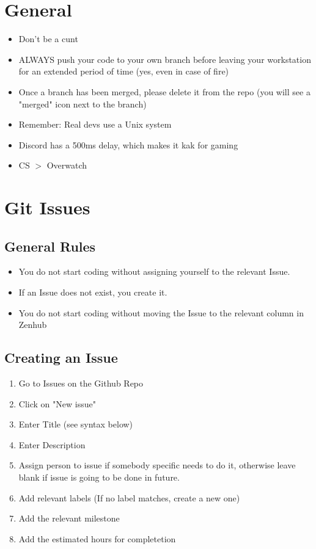 \documentclass{article}
\begin{document}
\newpage
\tableofcontents
\newpage
	
	\section{General}
		\begin{itemize}
			\item Don't be a cunt
			\item ALWAYS push your code to your own branch before leaving your workstation for an extended period of time (yes, even in case of fire)
			\item Once a branch has been merged, please delete it from the repo (you will see a "merged" icon next to the branch)
			\item Remember: Real devs use a Unix system
			\item Discord has a 500ms delay, which makes it kak for gaming
			\item CS $>$ Overwatch
		\end{itemize}
		
	\section{Git Issues}
		\subsection{General Rules}
			\begin{itemize}
				\item You do not start coding without assigning yourself to the relevant Issue.
				\item If an Issue does not exist, you create it.
				\item You do not start coding without moving the Issue to the relevant column in Zenhub
			\end{itemize}
			
		\subsection{Creating an Issue}
			\begin{enumerate}
				\item Go to Issues on the Github Repo
				\item Click on "New issue"
				\item Enter Title (see syntax below)
				\item Enter Description
				\item Assign person to issue if somebody specific needs to do it, otherwise leave blank if issue is going to be done in future.
				\item Add relevant labels (If no label matches, create a new one)
				\item Add the relevant milestone
				\item Add the estimated hours for completetion
			\end{enumerate}
\end{document}
